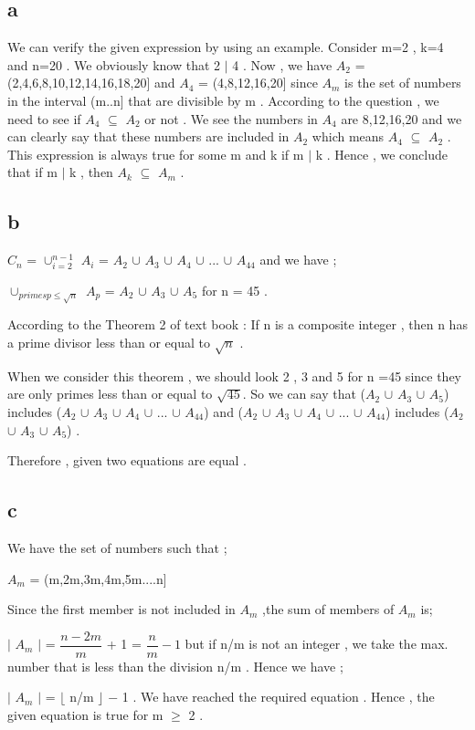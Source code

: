 \documentclass[12pt]{article}
\begin{document}
\subsection*{a}
\hspace{15px} We can verify the given expression by using an example. Consider m=2 , k=4 and n=20 . We obviously know that 2 $|$ 4 . Now , we have \textit{$A_2$} = (2,4,6,8,10,12,14,16,18,20] and \textit{$A_4$} = (4,8,12,16,20] since \textit{$A_m$} is the set of numbers in the interval
(m..n] that are divisible by m . According to the question , we need to see if \textit{$A_4$} $\subseteq$ \textit{$A_2$} or not . We see the numbers in \textit{$A_4$} are 8,12,16,20  and we can clearly say that these numbers are included in \textit{$A_2$} which means \textit{$A_4$} $\subseteq$ \textit{$A_2$} . This expression is always true for some m and k if m $|$ k  . Hence , we conclude that if m $|$ k , then \textit{$A_k$} $\subseteq$ \textit{$A_m$} .
\subsection*{b}
\hspace{15px} \textit{$C_n$} = $\cup^{n-1}_{i=2}$ \textit{$A_i$} = \textit{$A_2$} $\cup$ \textit{$A_3$} $\cup$ \textit{$A_4$} $\cup$ ... $\cup$ \textit{$A_{44}$} and we have ;\par 
$\cup_{primes p \leq \sqrt{n}}$ \textit{$A_p$} = \textit{$A_2$} $\cup$ \textit{$A_3$} $\cup$ \textit{$A_5$} for n = 45 .\par 
According to the Theorem 2 of text book : If n is a composite integer ,  then n has a prime divisor less than or equal to $\sqrt{n}$ . \par 
When we consider this theorem , we should look 2 , 3 and 5 for n =45 since they are only primes less than or equal to $\sqrt{45}$. So we can say that (\textit{$A_2$} $\cup$ \textit{$A_3$} $\cup$ \textit{$A_5$}) includes (\textit{$A_2$} $\cup$ \textit{$A_3$} $\cup$ \textit{$A_4$} $\cup$ ... $\cup$ \textit{$A_{44}$}) and (\textit{$A_2$} $\cup$ \textit{$A_3$} $\cup$ \textit{$A_4$} $\cup$ ... $\cup$ \textit{$A_{44}$}) includes (\textit{$A_2$} $\cup$ \textit{$A_3$} $\cup$ \textit{$A_5$}) . \par 
Therefore , given two equations are equal .

\subsection*{c}
\hspace{15px} We have the set of numbers such that ; \par 
\textit{$A_m$} = (m,2m,3m,4m,5m....n] \par 
Since the first member is not included in \textit{$A_m$} ,the sum of members of \textit{$A_m$} is;  \par $|$ \textit{$A_m$} $|$ = $\dfrac{n-2m}{m}$ + 1 = $\dfrac{n}{m} - 1$ but if n/m is not an integer , we take the max. number that is less than the division n/m . Hence we have ; \par 
$|$ \textit{$A_m$} $|$ = $\lfloor$ n/m  $\rfloor$ \textit{$-$} 1 . We have reached the required equation . Hence , the given equation is true for m $\geq$ 2 .
\end{document}
